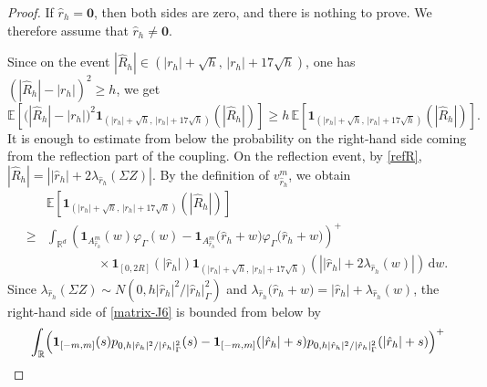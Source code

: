 \documentclass[aap]{imsart}
\theoremstyle{plain}
\theoremstyle{definition}
\begin{document}
\begin{proof}
	If \(\hat r_h=\mathbf 0\), then both sides are zero, and there is nothing
	to prove. We therefore assume that \(\hat r_h\neq \mathbf 0\).
	
	Since on the event \(|\hat R_h|\in(|r_h|+\sqrt h,\,|r_h|+17\sqrt h)\), one has \((|\hat R_h|-|r_h|)^2\geqslant h\),
	we get
	\begin{equation}\label{matrix-J6-start}
			\mathbb E\left[
			\bigl(|\hat R_h|-|r_h|\bigr)^2
			\mathbf 1_{(|r_h|+\sqrt h,\,|r_h|+17\sqrt h)}
			(|\hat R_h|)
			\right]\geqslant
			h\,
			\mathbb E\left[
			\mathbf 1_{(|r_h|+\sqrt h,\,|r_h|+17\sqrt h)}
			(|\hat R_h|)
			\right].
	\end{equation}
	It is enough to estimate from below the probability on the right-hand side
	coming from the reflection part of the coupling.
	On the reflection event, by \eqref{refR}, \(|\hat R_h|
	=
	\left|
	|\hat r_h|
	+
	2\lambda_{\hat r_h}(\Sigma Z)
	\right|\). By the definition of \(v_{\hat r_h}^m\), we obtain
	\begin{equation}\label{matrix-J6}
		\begin{aligned}
			&\mathbb E\left[
			\mathbf 1_{(|r_h|+\sqrt h,\,|r_h|+17\sqrt h)}
			(|\hat R_h|)
			\right]                                            \\
			\geqslant&
			\int_{\mathbb R^d}
			\left(
			\mathbf 1_{A_{\hat r_h}^m}(w)\varphi_\Gamma(w)
			-
			\mathbf 1_{A_{\hat r_h}^m}
			\bigl(\hat r_h+w\bigr)
			\varphi_\Gamma
			\bigl(\hat r_h+w\bigr)
			\right)^+                                          \\
			&\qquad\qquad\times
			\mathbf 1_{[0,2R]}(|\hat r_h|)
			\mathbf 1_{(|r_h|+\sqrt h,\,|r_h|+17\sqrt h)}
			\left(
			\left|
			|\hat r_h|
			+
			2\lambda_{\hat r_h}(w)
			\right|
			\right)
			\,\mathrm dw .
		\end{aligned}
	\end{equation}
	Since \(\lambda_{\hat r_h}(\Sigma Z)
	\sim N(0,h|\hat r_h|^2/|\hat r_h|_\Gamma^2)\) and \(\lambda_{\hat r_h}
	\bigl(\hat r_h+w\bigr)
	=
	|\hat r_h|+\lambda_{\hat r_h}(w)\),
	the right-hand side of \eqref{matrix-J6} is bounded from below by
	\begin{equation}\label{matrix-J6-one-dim}
		\begin{aligned}
			&\int_{\mathbb R}
			\Bigl(
			\mathbf 1_{[-m,m]}(s)
			p_{0,h|\hat r_h|^2/|\hat r_h|_\Gamma^2}(s)
			-
			\mathbf 1_{[-m,m]}(|\hat r_h|+s)
			p_{0,h|\hat r_h|^2/|\hat r_h|_\Gamma^2}(|\hat r_h|+s)
			\Bigr)^+                                           \\

\end{aligned}
\end{equation}
\end{proof}
\end{document}

